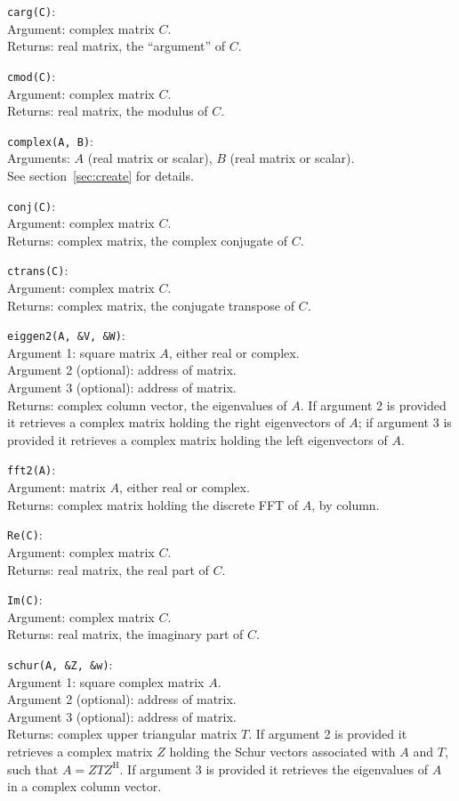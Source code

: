 \documentclass{article}
\begin{document}
\texttt{carg(C)}:\\
Argument: complex matrix $C$.\\
Returns: real matrix, the ``argument'' of $C$.

\texttt{cmod(C)}:\\
Argument: complex matrix $C$.\\
Returns: real matrix, the modulus of $C$.

\texttt{complex(A, B)}:\\
Arguments: $A$ (real matrix or scalar), $B$ (real matrix or scalar).\\
See section~\ref{sec:create} for details.

\texttt{conj(C)}:\\
Argument: complex matrix $C$.\\
Returns: complex matrix, the complex conjugate of $C$.

\texttt{ctrans(C)}:\\
Argument: complex matrix $C$.\\
Returns: complex matrix, the conjugate transpose of $C$.

\texttt{eiggen2(A, \&V, \&W)}:\\
Argument 1: square matrix $A$, either real or complex.\\
Argument 2 (optional): address of matrix.\\
Argument 3 (optional): address of matrix.\\
Returns: complex column vector, the eigenvalues of $A$. If argument 2
is provided it retrieves a complex matrix holding the right
eigenvectors of $A$; if argument 3 is provided it retrieves a complex
matrix holding the left eigenvectors of $A$.

\texttt{fft2(A)}:\\
Argument: matrix $A$, either real or complex.\\
Returns: complex matrix holding the discrete FFT of $A$, by
column.

\texttt{Re(C)}:\\
Argument: complex matrix $C$.\\
Returns: real matrix, the real part of $C$.

\texttt{Im(C)}:\\
Argument: complex matrix $C$.\\
Returns: real matrix, the imaginary part of $C$.

\texttt{schur(A, \&Z, \&w)}:\\
Argument 1: square complex matrix $A$.\\
Argument 2 (optional): address of matrix.\\
Argument 3 (optional): address of matrix.\\
Returns: complex upper triangular matrix $T$. If argument 2 is
provided it retrieves a complex matrix $Z$ holding the Schur vectors
associated with $A$ and $T$, such that $A = ZTZ^{\mathrm H}$. If
argument 3 is provided it retrieves the eigenvalues of $A$ in
a complex column vector.
\end{document}

